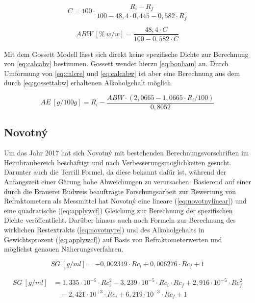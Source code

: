 \documentclass[a4paper,parskip=half]{scrartcl}
\newcommand{\bxi}{\mathit{R}_i}
\newcommand{\bxic}{\mathit{Rc}_i}
\newcommand{\bxf}{\mathit{R}_f}
\newcommand{\bxfc}{\mathit{Rc}_f}
\newcommand{\sg}{\mathit{SG}}
\newcommand{\abw}{\mathit{ABW}}
\newcommand{\aex}{\mathit{AE}}
\begin{document}
\begin{equation}
C = 100 \cdot \frac{\bxi - \bxf}{100 - 48,4 \cdot 0,445 - 0,582 \cdot \bxf}
\label{eq:gossett} 
\end{equation}

\begin{equation}
\abw\:[\%\:w/w] = \frac{48,4 \cdot C}{100 - 0,582 \cdot C}
\label{eq:gossettabw} 
\end{equation}

Mit dem Gossett Modell lässt sich direkt keine spezifische Dichte
zur Berechnung von \autoref{eq:calcabv} bestimmen. Gossett wendet
hierzu \autoref{eq:bonham} an. Durch Umformung von
\autoref{eq:calcre} und \autoref{eq:calcabw} ist aber eine Berechnung
aus dem durch \autoref{eq:gossettabw} erhaltenen Alkoholgehalt möglich.

\begin{equation}
\aex\:[g/100g] = \bxi - \frac{\abw \cdot (2,0665 - 1,0665 \cdot \bxi / 100)}{0,8052}
\label{eq:gossettcor}
\end{equation}

\subsection*{Novotný}

Um das Jahr 2017 hat sich Novotný mit bestehenden Berechnungsvorschriften
im Heimbraubereich beschäftigt und nach Verbesserungsmöglichkeiten
gesucht. Darunter auch die Terrill Formel, da diese bekannt dafür
ist, während der Anfangszeit einer Gärung hohe Abweichungen
zu verursachen. Basierend auf einer durch die Brauerei Budweis beauftragte Forschungsarbeit zur Bewertung von Refraktometern als Messmittel
hat Novotný eine lineare (\autoref{eq:novotnylinear}) und eine quadratische
(\autoref{eq:applywcf}) Gleichung zur Berechnung der spezifischen
Dichte veröffentlicht. Darüber hinaus auch noch Formeln zur
Berechnung des wirklichen Restextrakts (\autoref{eq:novotnyre}) und
des Alkoholgehalts in Gewichtsprozent (\autoref{eq:applywcf}) auf Basis
von Refraktometerwerten und möglichst genauen Näherungsverfahren. \autocite{Novotny2017a,Novotny2017,Savel2009}

\begin{equation} 
\sg\:[g/ml] = -0,002349 \cdot \bxic + 0,006276 \cdot \bxfc + 1
\label{eq:novotnylinear} 
\end{equation}

\begin{align}
\begin{split}
\sg\:[g/ml] &= 1,335 \cdot 10^{-5} \cdot \bxic^2 - 3,239 \cdot 10^{-5} \cdot \bxic \cdot \bxfc + 2,916 \cdot 10^{-5} \cdot \bxfc^2 \\
& \quad - 2,421 \cdot 10^{-3} \cdot \bxic + 6,219 \cdot 10^{-3} \cdot \bxfc + 1
\end{split} \label{eq:novotnyquadratic} 
\end{align}
\end{document}
